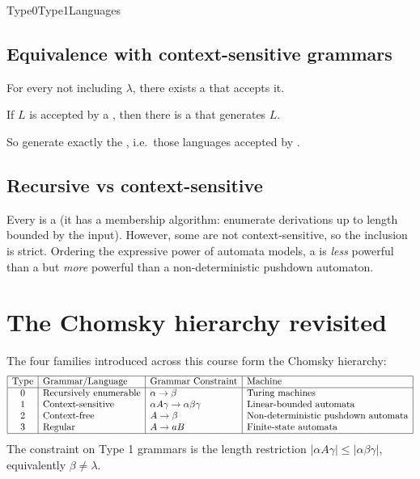 \documentclass[hidelinks]{article}
\begin{document}
\begin{smodule}[title={Type 0 and Type 1 Languages and their Automata}]{Type0Type1Languages}
\subsection{Equivalence with context-sensitive grammars}

\begin{sparagraph}[title={Theorem: every CSL is accepted by an LBA}]
For every  not including $\lambda$, there exists a  that accepts it.
\end{sparagraph}

\begin{sparagraph}[title={Theorem: every LBA-accepted language is a CSL}]
If $L$ is accepted by a , then there is a  that generates $L$.
\end{sparagraph}

So  generate exactly the , i.e.\ those languages accepted by .

\subsection{Recursive vs context-sensitive}

Every  is a  (it has a membership algorithm: enumerate derivations up to length bounded by the input). However, some  are not context-sensitive, so the inclusion is strict. Ordering the expressive power of automata models, a  is \emph{less} powerful than a  but \emph{more} powerful than a non-deterministic pushdown automaton.

\section{The Chomsky hierarchy revisited}

The four families introduced across this course form the Chomsky hierarchy:
\[
\begin{array}{|c|l|l|l|}
\hline
\text{Type} & \text{Grammar/Language} & \text{Grammar Constraint} & \text{Machine}\\
\hline
0 & \text{Recursively enumerable} & \alpha \to \beta & \text{Turing machines}\\
1 & \text{Context-sensitive} & \alpha A \gamma \to \alpha \beta \gamma & \text{Linear-bounded automata}\\
2 & \text{Context-free} & A \to \beta & \text{Non-deterministic pushdown automata}\\
3 & \text{Regular} & A \to aB & \text{Finite-state automata}\\
\hline
\end{array}
\]
The constraint on Type 1 grammars is the length restriction $|\alpha A \gamma| \leq |\alpha \beta \gamma|$, equivalently $\beta \neq \lambda$.


\end{smodule}
\end{document}
